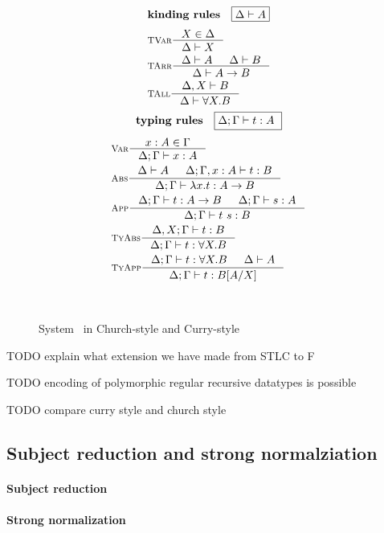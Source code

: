 \begin{figure}
\begin{singlespace}
\begin{minipage}{.46\textwidth}
\begin{align*}
\end{align*}
\[ \textbf{kinding rules} \quad \framebox{$ \Delta |- A $}\]\vspace*{-1em}
\begin{align*}
& \inference[\sc TVar]{X \in \Delta}{\Delta |- X} \\
& \inference[\sc TArr]{\Delta |- A & \Delta |- B}{\Delta |- A -> B} \\
& \inference[\sc TAll]{\Delta,X |- B}{\Delta |- \forall X.B} \\
\end{align*}
\[ \textbf{typing rules} \quad \framebox{$ \Delta;\Gamma |- t : A $ } \]
\vspace*{-1em}
\begin{align*}
& \inference[\sc Var]{x:A \in \Gamma}{\Delta;\Gamma |- x:A} \\
& \inference[\sc Abs]{\Delta |- A & \Delta;\Gamma,x:A |- t : B}
		     {\Delta;\Gamma |- \l x   .t : A -> B} \\
& \inference[\sc App]{\Delta;\Gamma |- t : A -> B & \Delta;\Gamma |- s : A}
		     {\Delta;\Gamma |- t~s : B} \\
& \inference[\sc TyAbs]{\Delta,X;\Gamma |- t : B}
		       {\Delta;\Gamma |- t : \forall X.B} \\
& \inference[\sc TyApp]{\Delta;\Gamma |- t : \forall X.B & \Delta |- A}
		       {\Delta;\Gamma |- t : B[A/X]}
\end{align*}
\end{minipage}
~\\
\caption{System \F\ in Church-style and Curry-style}
\label{fig:f}
\end{singlespace}
\end{figure}


TODO explain what extension we have made from STLC to F

TODO encoding of polymorphic regular recursive datatypes is possible

TODO compare curry style and church style


\subsection{Subject reduction and strong normalziation}\label{sec:f:srsn}
\paragraph{Subject reduction}

\paragraph{Strong normalization}

